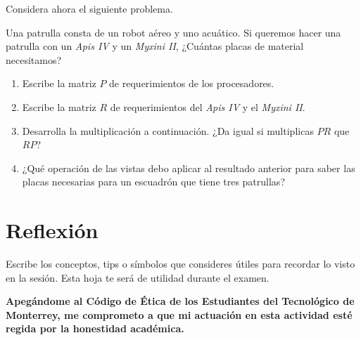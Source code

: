 \documentclass[spanish, 10pt]{article}
\begin{document}
\pagebreak

Considera ahora el siguiente problema.

Una patrulla consta de un robot aéreo y uno acuático.
Si queremos hacer una patrulla con un \textit{Apis IV} y un \textit{Myxini II}, ¿Cuántas placas de material necesitamos?

\bigskip

\begin{enumerate}
    \itemsep15ex
    \item Escribe la matriz $P$ de requerimientos de los procesadores.
    \item Escribe la matriz $R$ de requerimientos del \textit{Apis IV} y el \textit{Myxini II}.
    \item Desarrolla la multiplicación a continuación. ¿Da igual si multiplicas $PR$ que $RP$?
    \item ¿Qué operación de las vistas debo aplicar al resultado anterior para saber las placas necesarias para un escuadrón que tiene tres patrullas?
\end{enumerate}

\section{Reflexión}

Escribe los conceptos, tips o símbolos que consideres útiles para recordar lo visto en la sesión. Esta hoja te será de utilidad durante el examen.

\vfill

\textbf{Apegándome al Código de Ética de los Estudiantes del Tecnológico de Monterrey, me comprometo a que mi actuación en esta actividad esté regida por la honestidad académica.}
\end{document}
